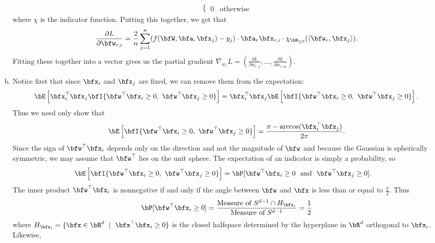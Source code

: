 \begin{homework}[e]
\begin{prf}
\begin{enumerate}[(a)]
\begin{align*}
\begin{cases}
              0 & \text{otherwise}
            \end{cases}
          \end{align*}
          where $\chi$ is the indicator function. Putting this together, we get that
          \begin{align*}
            \frac{\partial L}{\partial \bfw_{r,i}} = \frac{2}{n}\sum_{j=1}^n (f(\bfW,\bfa, \bfx_j) - y_j) \cdot \bfa_r \bfx_{r,i} \cdot \chi_{\bR_{\geq 0}}(\langle \bfw_r, \bfx_j \rangle).
          \end{align*}
          Fitting these together into a vector gives us the partial gradient $\nabla_{w_r} L = \left(\frac{\partial L}{\partial w_{r,1}}, ..., \frac{\partial L}{\partial w_{r,m}}\right)$.
        \item Notice first that since $\bfx_i$ and $\bfx_j$ are fixed, we can remove them from the expectation:
          \begin{align*}
            \bE\left[\bfx_i^\top \bfx_j \bfI\{\bfw^\top \bfx_i \geq 0, ~ \bfw^\top\bfx_j \geq 0\}\right] = \bfx_i^\top \bfx_j\bE\left[ \bfI\{\bfw^\top \bfx_i \geq 0, ~ \bfw^\top\bfx_j \geq 0\}\right].
          \end{align*}
          Thus we need only show that
          \begin{align*}
            \bE\left[ \bfI\{\bfw^\top \bfx_i \geq 0, ~ \bfw^\top\bfx_j \geq 0\}\right] = \frac{\pi - \arccos(\bfx_i^\top \bfx_j)}{2\pi}.
          \end{align*}
          Since the sign of $\bfw^\top\bfx_i$ depends only on the direction and not the magnitude of $\bfw$ and because the Gaussian is spherically symmetric, we may assume that $\bfw^\top$ lies on the unit sphere. The expectation of an indicator is simply a probability, so
          \begin{align*}
            \bE\left[ \bfI\{\bfw^\top \bfx_i \geq 0, ~ \bfw^\top\bfx_j \geq 0\}\right] &= \bP[\bfw^\top \bfx_i \geq 0 ~\text{ and } ~ \bfw^\top\bfx_j \geq 0].
          \end{align*}
          The inner product $\bfw^\top \bfx_i$ is nonnegative if and only if the angle between $\bfw$ and $\bfx$ is less than or equal to $\frac{\pi}{2}$. Thus
          \begin{align*}
            \bP[\bfw^\top \bfx_i \geq 0] = \frac{\text{Measure of } S^{d-1} \cap H_{\bfx_i}}{\text{Measure of } S^{d-1}} = \frac{1}{2}
          \end{align*}
          where $H_{\bfx_i} = \{\bfx \in \bR^d ~\mid~ \bfx^\top \bfx_i \geq 0\}$ is the closed halfspace determined by the hyperplane in $\bR^{d}$ orthogonal to $\bfx_i$. Likewise,

\end{enumerate}
\end{prf}
\end{homework}
